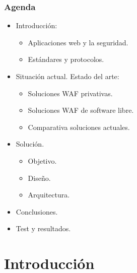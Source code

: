 \begin{frame}[shrink=20]
  \frametitle{Agenda}
  \begin{itemize}
    \item Introducción:
      \begin{itemize}
        \item Aplicaciones web y la seguridad.
        \item Estándares y protocolos.
      \end{itemize}
    \item Situación actual. Estado del arte:
      \begin{itemize}
        \item Soluciones WAF privativas.
        \item Soluciones WAF de software libre.
        \item Comparativa soluciones actuales.
      \end{itemize}
    \item Solución.
      \begin{itemize}
        \item Objetivo.
        \item Diseño.
        \item Arquitectura.
      \end{itemize}
    \item Conclusiones.
    \item Test y resultados.
  \end{itemize}
\end{frame}

\section{Introducción}
